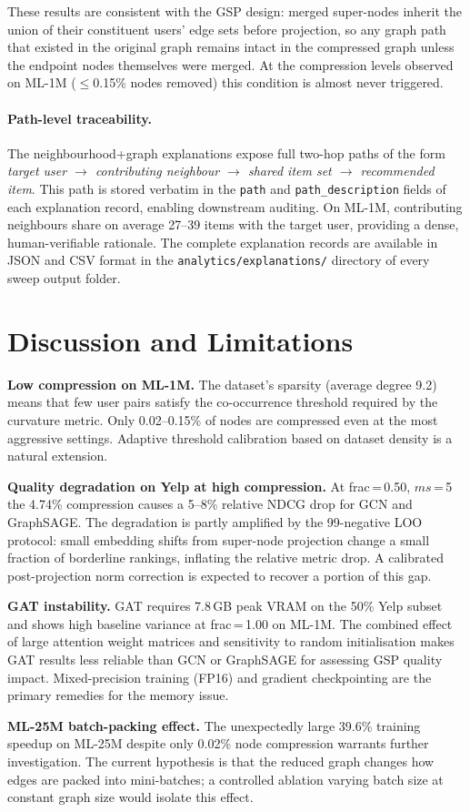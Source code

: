 These results are consistent with the GSP design: merged super-nodes inherit the union of their constituent users' edge sets before projection, so any graph path that existed in the original graph remains intact in the compressed graph unless the endpoint nodes themselves were merged. At the compression levels observed on ML-1M ($\leq$0.15\% nodes removed) this condition is almost never triggered.

\paragraph{Path-level traceability.}
The neighbourhood+graph explanations expose full two-hop paths of the form \emph{target user $\to$ contributing neighbour $\to$ shared item set $\to$ recommended item}. This path is stored verbatim in the \texttt{path} and \texttt{path\_description} fields of each explanation record, enabling downstream auditing. On ML-1M, contributing neighbours share on average 27--39 items with the target user, providing a dense, human-verifiable rationale. The complete explanation records are available in JSON and CSV format in the \texttt{analytics/explanations/} directory of every sweep output folder.

\section{Discussion and Limitations}
\label{sec:discussion}

\textbf{Low compression on ML-1M.} The dataset's sparsity (average degree 9.2) means that few user pairs satisfy the co-occurrence threshold required by the curvature metric. Only 0.02--0.15\% of nodes are compressed even at the most aggressive settings. Adaptive threshold calibration based on dataset density is a natural extension.

\textbf{Quality degradation on Yelp at high compression.} At frac\,=\,0.50, $ms$\,=\,5 the 4.74\% compression causes a 5--8\% relative NDCG drop for GCN and GraphSAGE. The degradation is partly amplified by the 99-negative LOO protocol: small embedding shifts from super-node projection change a small fraction of borderline rankings, inflating the relative metric drop. A calibrated post-projection norm correction is expected to recover a portion of this gap.

\textbf{GAT instability.} GAT requires 7.8\,GB peak VRAM on the 50\% Yelp subset and shows high baseline variance at frac\,=\,1.00 on ML-1M. The combined effect of large attention weight matrices and sensitivity to random initialisation makes GAT results less reliable than GCN or GraphSAGE for assessing GSP quality impact. Mixed-precision training (FP16) and gradient checkpointing are the primary remedies for the memory issue.

\textbf{ML-25M batch-packing effect.} The unexpectedly large 39.6\% training speedup on ML-25M despite only 0.02\% node compression warrants further investigation. The current hypothesis is that the reduced graph changes how edges are packed into mini-batches; a controlled ablation varying batch size at constant graph size would isolate this effect.


